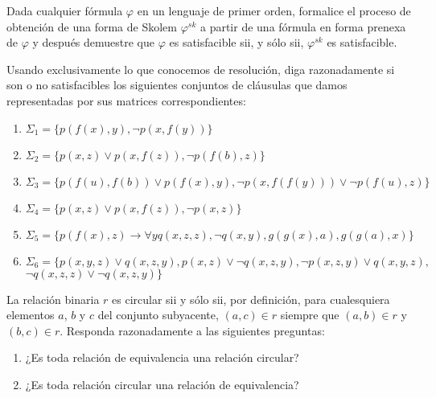 \documentclass[12pt]{article}
\begin{document}
\begin{ejercicio}
    Dada cualquier fórmula $\varphi$ en un lenguaje de primer orden, formalice el proceso de obtención de una forma de Skolem $\varphi^{sk}$ a partir de una fórmula en forma prenexa de $\varphi$ y después demuestre que $\varphi$ es satisfacible sii, y sólo sii, $\varphi^{sk}$ es satisfacible.
\end{ejercicio}
\begin{ejercicio}
    Usando exclusivamente lo que conocemos de resolución, diga razonadamente si son o no satisfacibles los siguientes conjuntos de cláusulas que damos representadas por sus matrices correspondientes:
    \begin{enumerate}
        \item $\Sigma_1 = \{p(f(x), y), \neg p(x, f(y))\}$
        \item $\Sigma_2 = \{p(x, z) \lor p(x, f(z)), \neg p(f(b), z)\}$
        \item $\Sigma_3 = \{p(f(u), f(b)) \lor p(f(x), y), \neg p(x, f(f(y))) \lor \neg p(f(u), z)\}$
        \item $\Sigma_4 = \{p(x, z) \lor p(x, f(z)), \neg p(x, z)\}$
        \item $\Sigma_5 = \{p(f(x), z) \rightarrow \forall y q(x, z, z), \neg q(x, y), g(g(x), a), g(g(a), x)\}$
        \item $\Sigma_6 = \{p(x, y, z) \lor q(x, z, y), p(x, z) \lor \neg q(x, z, y), \neg p(x, z, y) \lor q(x, y, z),$\\$\neg q(x, z, z) \lor \neg q(x, z, y)\}$
    \end{enumerate}
\end{ejercicio}
\begin{ejercicio}
    La relación binaria $r$ es circular sii y sólo sii, por definición, para cualesquiera elementos $a$, $b$ y $c$ del conjunto subyacente, $(a, c) \in r$ siempre que $(a, b) \in r$ y $(b, c) \in r$. Responda razonadamente a las siguientes preguntas:
    \begin{enumerate}
        \item ¿Es toda relación de equivalencia una relación circular?
        \item ¿Es toda relación circular una relación de equivalencia?
    \end{enumerate}
\end{ejercicio}


    
\end{document}
